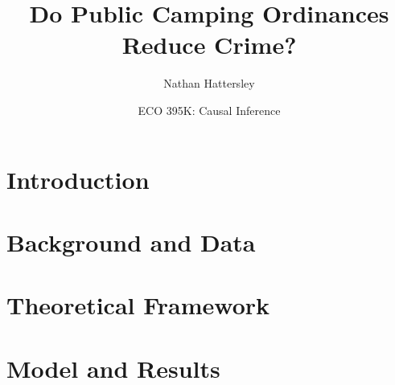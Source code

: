 \documentclass{article}
\author{Nathan Hattersley}
\title{Do Public Camping Ordinances Reduce Crime?}
\date{ECO 395K: Causal Inference}
\begin{document}
    \maketitle
    \section{Introduction}
    
    \section{Background and Data}
    
    \section{Theoretical Framework}
    
    \section{Model and Results}
    
\end{document}

